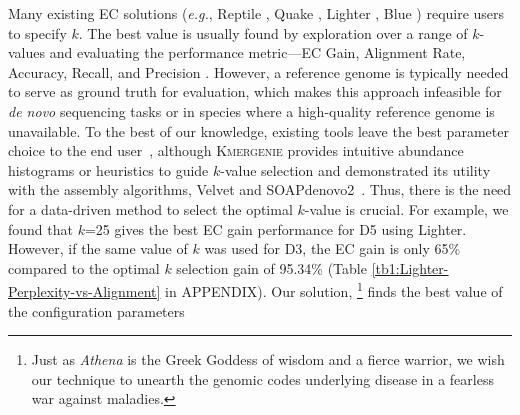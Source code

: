 Many existing EC solutions (\textit{e.g.}, Reptile \cite{yang2010reptile}, Quake \cite{kelley2010quake}, Lighter \cite{song2014lighter}, Blue \cite{greenfield2014blue}) require users to specify $k$. The best value is usually found by exploration over a range of $k$-values \cite{kao2011echo} and evaluating the performance metric---\eg EC Gain, Alignment Rate, Accuracy, Recall, and Precision \cite{heydari2017evaluation}.
However, a reference genome is typically needed to serve as ground truth for evaluation, which makes this approach infeasible for \textit{de novo} sequencing tasks or in species where a high-quality reference genome is unavailable. 
To the best of our knowledge, existing tools leave the best parameter choice to the end user~\cite{peng2010idba, mahadik2017scalable}, although \textsc{Kmergenie} provides intuitive abundance histograms or heuristics to guide $k$-value selection and demonstrated its utility with the assembly algorithms, Velvet and SOAPdenovo2~\cite{chikhi2013informed}.
Thus, there is the need for a data-driven method to select the optimal $k$-value is crucial. 
For example, we found that $k$=25 gives the best EC gain performance for D5 using Lighter. However, if the same value of $k$ was used for D3, the EC gain is only 65\% compared to the optimal $k$ selection gain of 95.34\% (Table \ref{tb1:Lighter-Perplexity-vs-Alignment} in APPENDIX).
Our solution, {\em \name}\footnote{Just as \textit{Athena} is the Greek Goddess of wisdom and a fierce warrior, we wish our technique to unearth the genomic codes underlying disease in a fearless war against maladies.} finds the best value of the configuration parameters

